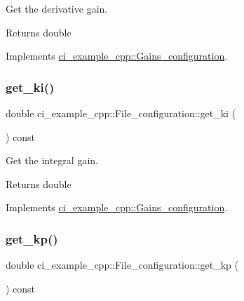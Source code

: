 Get the derivative gain. 

\begin{DoxyReturn}{Returns}
double 
\end{DoxyReturn}


Implements \hyperlink{classci__example__cpp_1_1Gains__configuration_a4bc25c0a8283f36366b888feaf15efa9}{ci\+\_\+example\+\_\+cpp\+::\+Gains\+\_\+configuration}.

\mbox{\label{classci__example__cpp_1_1File__configuration_a6e338977105cbcf8b822892d1feb9006}} 
\subsubsection{\texorpdfstring{get\+\_\+ki()}{get\_ki()}}
{\footnotesize\ttfamily double ci\+\_\+example\+\_\+cpp\+::\+File\+\_\+configuration\+::get\+\_\+ki (\begin{DoxyParamCaption}{ }\end{DoxyParamCaption}) const\hspace{0.3cm}{\ttfamily [virtual]}}



Get the integral gain. 

\begin{DoxyReturn}{Returns}
double 
\end{DoxyReturn}


Implements \hyperlink{classci__example__cpp_1_1Gains__configuration_a1ac03c97e04ebfbb3c29122e13b0ec0e}{ci\+\_\+example\+\_\+cpp\+::\+Gains\+\_\+configuration}.

\mbox{\label{classci__example__cpp_1_1File__configuration_a5d051da802569c36feeab2b1fbf9a09a}} 
\subsubsection{\texorpdfstring{get\+\_\+kp()}{get\_kp()}}
{\footnotesize\ttfamily double ci\+\_\+example\+\_\+cpp\+::\+File\+\_\+configuration\+::get\+\_\+kp (\begin{DoxyParamCaption}{ }\end{DoxyParamCaption}) const\hspace{0.3cm}{\ttfamily [virtual]}}



